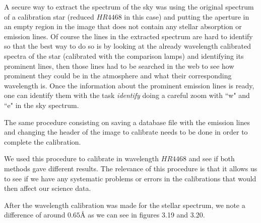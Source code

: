 A secure way to extract the spectrum of the sky was using the original spectrum of a calibration star (reduced $HR4468$ in this case) and putting the aperture in an empty region in the image that does not contain any stellar absorption or emission lines. Of course the lines in the extracted spectrum are hard to identify so that the best way to do so is by looking at the already wavelength calibrated spectra of the star (calibrated with the comparison lamps) and identifying its prominent lines, then those lines had to be searched in the web to see how prominent they could be in the atmosphere and what their corresponding wavelength is. Once the information about the prominent emission lines is ready, one can identify them with the task \textit{identify} doing a careful zoom with ``w" and ``e"  in the sky spectrum. 

The same procedure consisting on saving a database file with the emission lines and changing the header of the image to calibrate needs to be done in order to complete the calibration.

We used this procedure to calibrate in wavelength $HR4468$ and see if both methods gave different results. The relevance of this procedure is that it allows us to see if we have any systematic problems or errors in the calibrations that would then affect our science data.

After the wavelength calibration was made for the stellar spectrum, we note a difference of around $0.65 \textrm{\AA}$ as we can see in figures 3.19 and 3.20.


